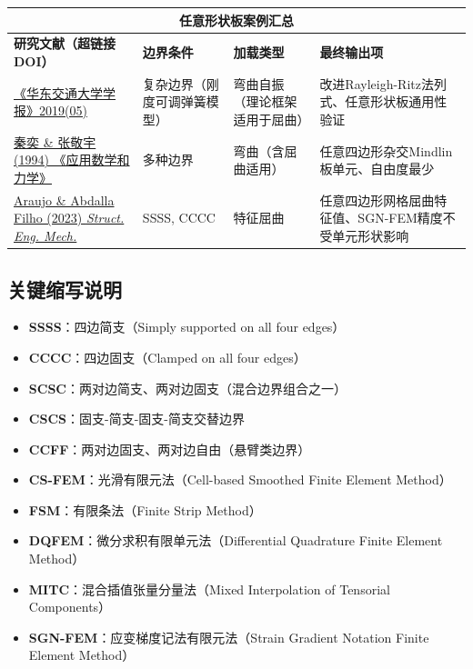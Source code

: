 \documentclass[12pt,a4paper]{article}
\begin{document}
{\small
\setlength{\tabcolsep}{3.5pt}
\begin{longtable}{|p{5.2cm}|p{1.8cm}|p{2.0cm}|p{5.2cm}|}
\hline
\multicolumn{4}{|c|}{任意形状板案例汇总} \\
\hline
\textbf{研究文献（超链接DOI）} & \textbf{边界条件} & \textbf{加载类型} & \textbf{最终输出项} \\
\hline
\endhead
\href{https://www.cnki.net/}{《华东交通大学学报》2019(05)} & 复杂边界（刚度可调弹簧模型） & 弯曲自振（理论框架适用于屈曲） & 改进Rayleigh-Ritz法列式、任意形状板通用性验证 \\
\hline
\href{https://doi.org/10.1007/BF02451054}{秦奕 \& 张敬宇 (1994) 《应用数学和力学》} & 多种边界 & 弯曲（含屈曲适用） & 任意四边形杂交Mindlin板单元、自由度最少 \\
\hline
\href{https://doi.org/10.12989/sem.2023.87.3.283}{Araujo \& Abdalla Filho (2023) \emph{Struct. Eng. Mech.}} & SSSS, CCCC & 特征屈曲 & 任意四边形网格屈曲特征值、SGN-FEM精度不受单元形状影响 \\
\hline
\bottomrule
\end{longtable}
}

\subsection*{关键缩写说明}

\begin{itemize}
    \item \textbf{SSSS}：四边简支（Simply supported on all four edges）
    \item \textbf{CCCC}：四边固支（Clamped on all four edges）
    \item \textbf{SCSC}：两对边简支、两对边固支（混合边界组合之一）
    \item \textbf{CSCS}：固支-简支-固支-简支交替边界
    \item \textbf{CCFF}：两对边固支、两对边自由（悬臂类边界）
    \item \textbf{CS-FEM}：光滑有限元法（Cell-based Smoothed Finite Element Method）
    \item \textbf{FSM}：有限条法（Finite Strip Method）
    \item \textbf{DQFEM}：微分求积有限单元法（Differential Quadrature Finite Element Method）
    \item \textbf{MITC}：混合插值张量分量法（Mixed Interpolation of Tensorial Components）
    \item \textbf{SGN-FEM}：应变梯度记法有限元法（Strain Gradient Notation Finite Element Method）
\end{itemize}
\end{document}
